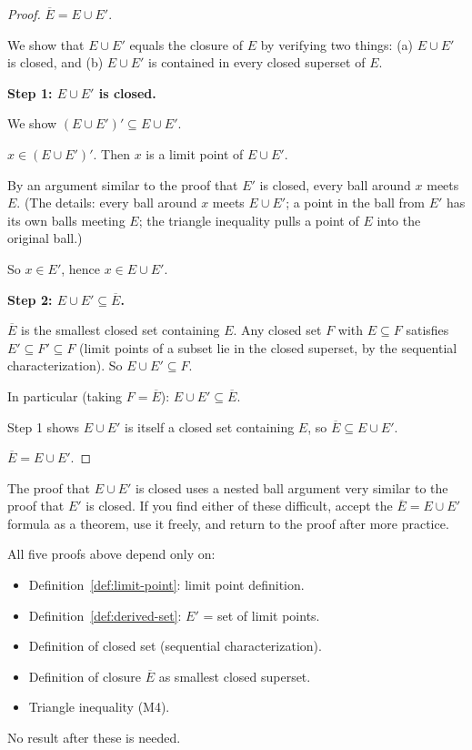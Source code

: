 \begin{proof}
\Claim $\overline{E} = E \cup E'$.

\Strategy We show that $E \cup E'$ equals the closure of $E$ by verifying two things:
(a) $E \cup E'$ is closed, and (b) $E \cup E'$ is contained in every closed superset of $E$.

\medskip
\noindent\textbf{Step 1: $E \cup E'$ is closed.}

We show $(E \cup E')' \subseteq E \cup E'$.

\Let $x \in (E \cup E')'$.  Then $x$ is a limit point of $E \cup E'$.

By an argument similar to the proof that $E'$ is closed, every ball around $x$ meets $E$.
(The details: every ball around $x$ meets $E \cup E'$; a point in the ball from $E'$
has its own balls meeting $E$; the triangle inequality pulls a point of $E$ into the
original ball.)

So $x \in E'$, hence $x \in E \cup E'$.

\medskip
\noindent\textbf{Step 2: $E \cup E' \subseteq \overline{E}$.}

\ByDef $\overline{E}$ is the smallest closed set containing $E$.
Any closed set $F$ with $E \subseteq F$ satisfies $E' \subseteq F' \subseteq F$
(limit points of a subset lie in the closed superset, by the sequential characterization).
So $E \cup E' \subseteq F$.

In particular (taking $F = \overline{E}$): $E \cup E' \subseteq \overline{E}$.

Step 1 shows $E \cup E'$ is itself a closed set containing $E$, so $\overline{E} \subseteq E \cup E'$.

\medskip
\Therefore $\overline{E} = E \cup E'$. \AsReq
\end{proof}

\begin{remark*}
The proof that $E \cup E'$ is closed uses a nested ball argument very similar
to the proof that $E'$ is closed. If you find either of these difficult,
accept the $\overline{E} = E \cup E'$ formula as a theorem, use it freely,
and return to the proof after more practice.
\end{remark*}

\begin{remark*}[Dependencies]
All five proofs above depend only on:
\begin{itemize}
  \item Definition~\ref{def:limit-point}: limit point definition.
  \item Definition~\ref{def:derived-set}: $E'$ = set of limit points.
  \item Definition of closed set (sequential characterization).
  \item Definition of closure $\overline{E}$ as smallest closed superset.
  \item Triangle inequality (M4).
\end{itemize}
No result after these is needed.
\end{remark*}
